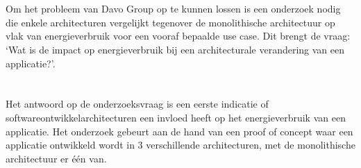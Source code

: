 
\section{}%
\label{sec:onderzoeksvraag}
Om het probleem van Davo Group op te kunnen lossen is een onderzoek nodig die enkele architecturen vergelijkt tegenover de monolithische architectuur op vlak van energieverbruik voor een vooraf bepaalde use case. Dit brengt de vraag: `Wat is de impact op energieverbruik bij een architecturale verandering van een applicatie?'.


\section{}%
\label{sec:onderzoeksdoelstelling}
Het antwoord op de onderzoeksvraag is een eerste indicatie of softwareontwikkelarchitecturen een invloed heeft op het energieverbruik van een applicatie. Het onderzoek gebeurt aan de hand van een proof of concept waar een applicatie ontwikkeld wordt in 3 verschillende architecturen, met de monolithische architectuur er één van. 

\section{}%
\label{sec:opzet-bachelorproef}

